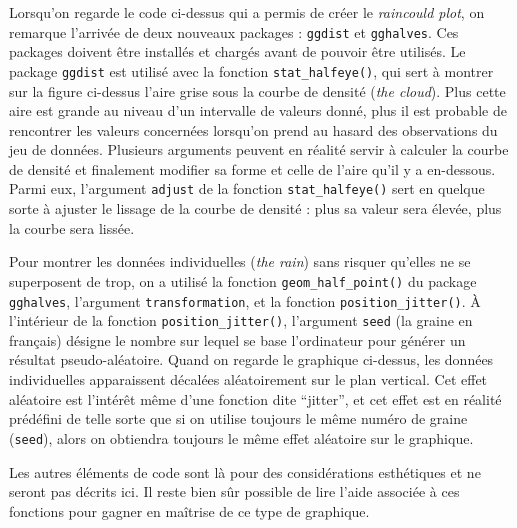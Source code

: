 \documentclass[
  french,
]{book}
\begin{document}
Lorsqu'on regarde le code ci-dessus qui a permis de créer le \emph{raincould plot}, on remarque l'arrivée de deux nouveaux packages : \texttt{ggdist} et \texttt{gghalves}. Ces packages doivent être installés et chargés avant de pouvoir être utilisés. Le package \texttt{ggdist} est utilisé avec la fonction \texttt{stat\_halfeye()}, qui sert à montrer sur la figure ci-dessus l'aire grise sous la courbe de densité (\emph{the cloud}). Plus cette aire est grande au niveau d'un intervalle de valeurs donné, plus il est probable de rencontrer les valeurs concernées lorsqu'on prend au hasard des observations du jeu de données. Plusieurs arguments peuvent en réalité servir à calculer la courbe de densité et finalement modifier sa forme et celle de l'aire qu'il y a en-dessous. Parmi eux, l'argument \texttt{adjust} de la fonction \texttt{stat\_halfeye()} sert en quelque sorte à ajuster le lissage de la courbe de densité : plus sa valeur sera élevée, plus la courbe sera lissée.

Pour montrer les données individuelles (\emph{the rain}) sans risquer qu'elles ne se superposent de trop, on a utilisé la fonction \texttt{geom\_half\_point()} du package \texttt{gghalves}, l'argument \texttt{transformation}, et la fonction \texttt{position\_jitter()}. À l'intérieur de la fonction \texttt{position\_jitter()}, l'argument \texttt{seed} (la graine en français) désigne le nombre sur lequel se base l'ordinateur pour générer un résultat pseudo-aléatoire. Quand on regarde le graphique ci-dessus, les données individuelles apparaissent décalées aléatoirement sur le plan vertical. Cet effet aléatoire est l'intérêt même d'une fonction dite ``jitter'', et cet effet est en réalité prédéfini de telle sorte que si on utilise toujours le même numéro de graine (\texttt{seed}), alors on obtiendra toujours le même effet aléatoire sur le graphique.

Les autres éléments de code sont là pour des considérations esthétiques et ne seront pas décrits ici. Il reste bien sûr possible de lire l'aide associée à ces fonctions pour gagner en maîtrise de ce type de graphique.
\end{document}
